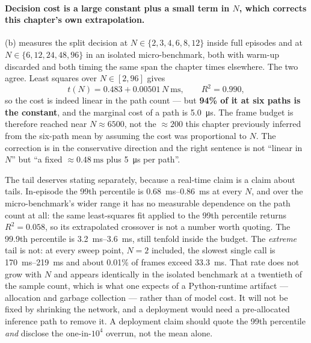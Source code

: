 \paragraph{Decision cost is a large constant plus a small term in $N$, which corrects this chapter's own
extrapolation.} (b) measures the split decision at
$N \in \{2, 3, 4, 6, 8, 12\}$ inside full episodes and at
$N \in \{6, 12, 24, 48, 96\}$ in an isolated micro-benchmark, both with warm-up discarded and both
timing the same span the chapter times elsewhere. The two agree. Least squares over
$N \in [2, 96]$ gives
\begin{equation}
t(N) = 0.483 + 0.00501\,N\ \text{ms}, \qquad R^2 = 0.990,
\label{eq:p2decisionfit}
\end{equation}
so the cost is indeed linear in the path count --- but \textbf{94\% of it at six paths is the constant},
and the marginal cost of a path is \SI{5.0}{\micro\second}. The frame budget is therefore reached near
$N \approx 6500$, not the ${\approx}200$ this chapter previously inferred from the six-path mean by
assuming the cost was proportional to $N$. The correction is in the
conservative direction and the right sentence is not ``linear in $N$'' but ``a fixed
${\approx}\SI{0.48}{\milli\second}$ plus \SI{5}{\micro\second} per path''.

The tail deserves stating separately, because a real-time claim is a claim about tails. In-episode the
99th percentile is \SIrange{0.68}{0.86}{\milli\second} at every $N$, and over the micro-benchmark's
wider range it has no measurable dependence on the path count at all: the same least-squares fit applied
to the 99th percentile returns $R^2 = 0.058$, so its extrapolated crossover is not a number worth
quoting. The 99.9th percentile is \SIrange{3.2}{3.6}{\milli\second}, still tenfold inside the budget.
The \emph{extreme} tail is not: at every sweep point, $N = 2$
included, the slowest single call is \SIrange{170}{219}{\milli\second} and about 0.01\% of frames exceed
\SI{33.3}{\milli\second}. That rate does not grow with $N$ and appears identically in the isolated
benchmark at a twentieth of the sample count, which is what one expects of a Python-runtime artifact ---
allocation and garbage collection --- rather than of model cost. It will not be fixed by shrinking the
network, and a deployment would need a pre-allocated inference path to remove it. A deployment claim
should quote the 99th percentile \emph{and} disclose the one-in-$10^4$ overrun, not the mean alone.

